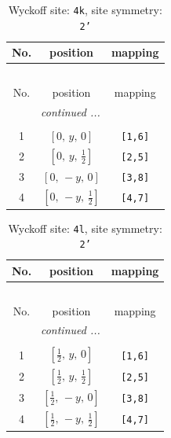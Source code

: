 \documentclass[fleqn,8pt]{jsarticle}
\begin{document}
\renewcommand{\arraystretch}{1.2}
\begin{longtable}{ccc}
\caption{Wyckoff site: {\tt 4k}, site symmetry: {\tt 2'}}
 \\
 \hline \hline
No. & position & mapping \\ \hline \endfirsthead

\multicolumn{2}{l}{\tablename\ \thetable{}} \\
 \hline \hline
No. & position & mapping \\ \hline \endhead

 \hline \hline
\multicolumn{2}{r}{\footnotesize\it continued ...} \\ \endfoot

 \hline \hline
\multicolumn{2}{r}{} \\ \endlastfoot

1 & $\left[ 0,\, y,\, 0 \right]$ & {\tt [1,6]} \\ \hline
2 & $\left[ 0,\, y,\, \frac{1}{2} \right]$ & {\tt [2,5]} \\ \hline
3 & $\left[ 0,\, - y,\, 0 \right]$ & {\tt [3,8]} \\ \hline
4 & $\left[ 0,\, - y,\, \frac{1}{2} \right]$ & {\tt [4,7]} \\
\end{longtable}
\renewcommand{\arraystretch}{1.2}
\begin{longtable}{ccc}
\caption{Wyckoff site: {\tt 4l}, site symmetry: {\tt 2'}}
 \\
 \hline \hline
No. & position & mapping \\ \hline \endfirsthead

\multicolumn{2}{l}{\tablename\ \thetable{}} \\
 \hline \hline
No. & position & mapping \\ \hline \endhead

 \hline \hline
\multicolumn{2}{r}{\footnotesize\it continued ...} \\ \endfoot

 \hline \hline
\multicolumn{2}{r}{} \\ \endlastfoot

1 & $\left[ \frac{1}{2},\, y,\, 0 \right]$ & {\tt [1,6]} \\ \hline
2 & $\left[ \frac{1}{2},\, y,\, \frac{1}{2} \right]$ & {\tt [2,5]} \\ \hline
3 & $\left[ \frac{1}{2},\, - y,\, 0 \right]$ & {\tt [3,8]} \\ \hline
4 & $\left[ \frac{1}{2},\, - y,\, \frac{1}{2} \right]$ & {\tt [4,7]} \\
\end{longtable}
\end{document}
